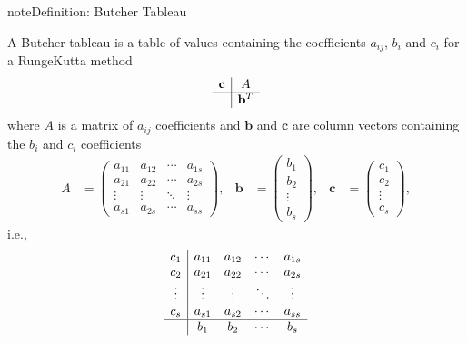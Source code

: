 \documentclass[letterpaper,10pt,english]{jupyterBook}
\begin{document}
\begin{sphinxadmonition}{note}{Definition: Butcher Tableau}

\sphinxAtStartPar
A Butcher tableau is a table of values containing the coefficients \(a_{ij}\), \(b_i\) and \(c_i\) for a Runge\sphinxhyphen{}Kutta method
\begin{align*}
    \begin{array}{c|c}
        \mathbf{c} & A \\ \hline
        & \mathbf{b}^T
    \end{array}
\end{align*}
\sphinxAtStartPar
where \(A\) is a matrix of \(a_{ij}\) coefficients and \(\mathbf{b}\) and \(\mathbf{c}\) are column vectors containing the \(b_i\) and \(c_i\) coefficients
\begin{align*}
    A &= \begin{pmatrix}
        a_{11} & a_{12} & \cdots & a_{1s} \\
        a_{21} & a_{22} & \cdots & a_{2s} \\
        \vdots & \vdots & \ddots & \vdots \\
        a_{s1} & a_{2s} & \cdots & a_{ss}
    \end{pmatrix}, &
    \mathbf{b} &= \begin{pmatrix} b_1 \\ b_2 \\ \vdots \\ b_s \end{pmatrix}, &
    \mathbf{c} &= \begin{pmatrix} c_1 \\ c_2 \\ \vdots \\ c_s \end{pmatrix},
\end{align*}
\sphinxAtStartPar
i.e.,
\begin{align*}
    \begin{array}{c|cccc}
        c_1  & a_{11}  & a_{12}  & \cdots  & a_{1s} \\
        c_2  & a_{21}  & a_{22}  & \cdots  & a_{2s} \\
        \vdots  & \vdots  & \vdots  & \ddots  & \vdots \\
        c_s  & a_{s1}  & a_{s2}  & \cdots  & a_{ss} \\ \hline
        & b_1  & b_2  & \cdots  & b_s 
    \end{array}
\end{align*}\end{sphinxadmonition}
\end{document}

